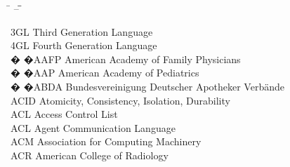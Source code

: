 \begin{tabbing}
    \hspace{1cm} \= \hspace{2cm} -- \= \hspace{1.5cm}\= \kill

    \>3GL \>\>Third Generation Language\\

    \>4GL \>\>Fourth Generation Language\\




 � �\>AAFP \>\>American Academy of Family Physicians\\

 � �\>AAP \>\>American Academy of Pediatrics\\

 � �\>ABDA \>\>Bundesvereinigung Deutscher Apotheker Verb\"{a}nde\\


    \>ACID \>\>Atomicity, Consistency, Isolation, Durability\\

    \>ACL \>\>Access Control List\\

    \>ACL \>\>Agent Communication Language\\

    \>ACM \>\>Association for Computing Machinery\\

    \>ACR \>\>American College of Radiology\\







\end{tabbing}

